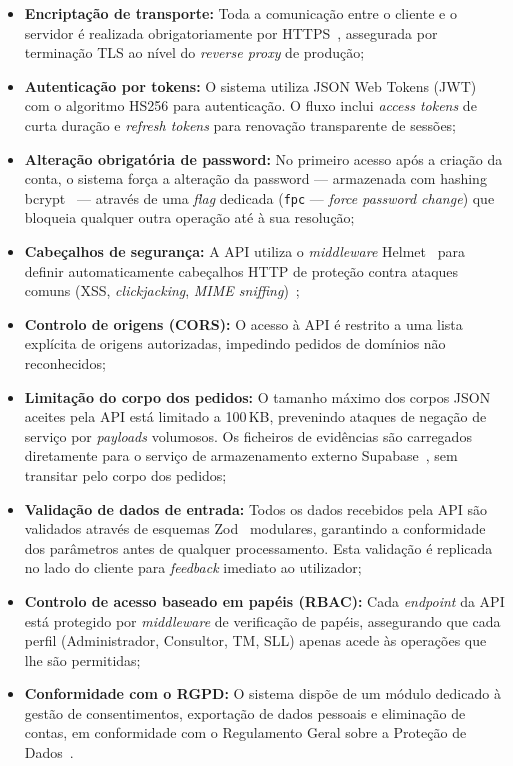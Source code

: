 \documentclass[12pt,a4paper]{report}
\begin{document}
\begin{itemize}
  \item \textbf{Encriptação de transporte:} Toda a comunicação entre o cliente e o servidor é realizada obrigatoriamente por HTTPS~\cite{restapi}, assegurada por terminação TLS ao nível do \textit{reverse proxy} de produção;
  \item \textbf{Autenticação por tokens:} O sistema utiliza JSON Web Tokens (JWT)~\cite{jwt} com o algoritmo HS256 para autenticação. O fluxo inclui \textit{access tokens} de curta duração e \textit{refresh tokens} para renovação transparente de sessões;
  \item \textbf{Alteração obrigatória de password:} No primeiro acesso após a criação da conta, o sistema força a alteração da password --- armazenada com hashing bcrypt~\cite{bcrypt} --- através de uma \textit{flag} dedicada (\texttt{fpc} --- \textit{force password change}) que bloqueia qualquer outra operação até à sua resolução;
  \item \textbf{Cabeçalhos de segurança:} A API utiliza o \textit{middleware} Helmet~\cite{helmet} para definir automaticamente cabeçalhos HTTP de proteção contra ataques comuns (XSS, \textit{clickjacking}, \textit{MIME sniffing})~\cite{owasp};
  \item \textbf{Controlo de origens (CORS):} O acesso à API é restrito a uma lista explícita de origens autorizadas, impedindo pedidos de domínios não reconhecidos;
  \item \textbf{Limitação do corpo dos pedidos:} O tamanho máximo dos corpos JSON aceites pela API está limitado a 100\,KB, prevenindo ataques de negação de serviço por \textit{payloads} volumosos. Os ficheiros de evidências são carregados diretamente para o serviço de armazenamento externo Supabase~\cite{supabase}, sem transitar pelo corpo dos pedidos;
  \item \textbf{Validação de dados de entrada:} Todos os dados recebidos pela API são validados através de esquemas Zod~\cite{zod} modulares, garantindo a conformidade dos parâmetros antes de qualquer processamento. Esta validação é replicada no lado do cliente para \textit{feedback} imediato ao utilizador;
  \item \textbf{Controlo de acesso baseado em papéis (RBAC):} Cada \textit{endpoint} da API está protegido por \textit{middleware} de verificação de papéis, assegurando que cada perfil (Administrador, Consultor, TM, SLL) apenas acede às operações que lhe são permitidas;
  \item \textbf{Conformidade com o RGPD:} O sistema dispõe de um módulo dedicado à gestão de consentimentos, exportação de dados pessoais e eliminação de contas, em conformidade com o Regulamento Geral sobre a Proteção de Dados~\cite{rgpd}.
\end{itemize}
\end{document}
